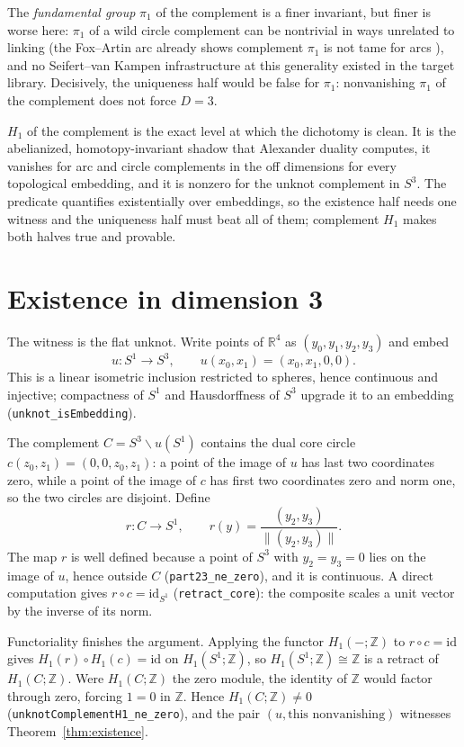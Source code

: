 \documentclass[11pt]{article}
\theoremstyle{definition}
\newcommand{\Z}{\mathbb{Z}}
\newcommand{\R}{\mathbb{R}}
\newcommand{\Sph}[1]{S^{#1}}
\newcommand{\lean}[1]{\texttt{#1}}
\begin{document}
The \emph{fundamental group} $\pi_1$ of the complement is a finer invariant, but finer is worse here: $\pi_1$ of a wild circle complement can be nontrivial in ways unrelated to linking (the Fox--Artin arc already shows complement $\pi_1$ is not tame for arcs \cite{foxartin}), and no Seifert--van Kampen infrastructure at this generality existed in the target library. Decisively, the uniqueness half would be false for $\pi_1$: nonvanishing $\pi_1$ of the complement does not force $D=3$.

$H_1$ of the complement is the exact level at which the dichotomy is clean. It is the abelianized, homotopy-invariant shadow that Alexander duality computes, it vanishes for arc and circle complements in the off dimensions for every topological embedding, and it is nonzero for the unknot complement in $\Sph{3}$. The predicate quantifies existentially over embeddings, so the existence half needs one witness and the uniqueness half must beat all of them; complement $H_1$ makes both halves true and provable.

\section{Existence in dimension 3}
\label{sec:existence}

The witness is the flat unknot. Write points of $\R^4$ as $(y_0, y_1, y_2, y_3)$ and embed
\[
u \colon S^1 \to \Sph{3}, \qquad u(x_0, x_1) = (x_0, x_1, 0, 0).
\]
This is a linear isometric inclusion restricted to spheres, hence continuous and injective; compactness of $S^1$ and Hausdorffness of $\Sph{3}$ upgrade it to an embedding (\lean{unknot\_isEmbedding}).

The complement $C = \Sph{3} \smallsetminus u(S^1)$ contains the dual core circle $c(z_0, z_1) = (0, 0, z_0, z_1)$: a point of the image of $u$ has last two coordinates zero, while a point of the image of $c$ has first two coordinates zero and norm one, so the two circles are disjoint. Define
\[
r \colon C \to S^1, \qquad r(y) = \frac{(y_2, y_3)}{\lVert (y_2, y_3) \rVert}.
\]
The map $r$ is well defined because a point of $\Sph{3}$ with $y_2 = y_3 = 0$ lies on the image of $u$, hence outside $C$ (\lean{part23\_ne\_zero}), and it is continuous. A direct computation gives $r \circ c = \mathrm{id}_{S^1}$ (\lean{retract\_core}): the composite scales a unit vector by the inverse of its norm.

Functoriality finishes the argument. Applying the functor $H_1(-;\Z)$ to $r \circ c = \mathrm{id}$ gives $H_1(r) \circ H_1(c) = \mathrm{id}$ on $H_1(S^1;\Z)$, so $H_1(S^1;\Z) \cong \Z$ is a retract of $H_1(C;\Z)$. Were $H_1(C;\Z)$ the zero module, the identity of $\Z$ would factor through zero, forcing $1 = 0$ in $\Z$. Hence $H_1(C;\Z) \neq 0$ (\lean{unknotComplementH1\_ne\_zero}), and the pair $(u, \text{this nonvanishing})$ witnesses Theorem~\ref{thm:existence}.
\end{document}
